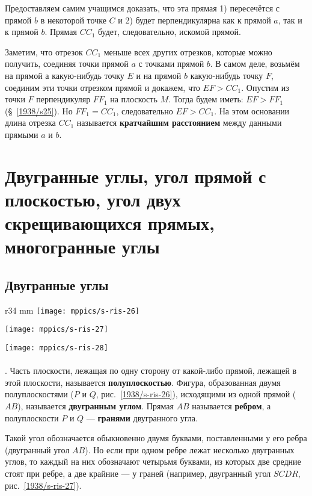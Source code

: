 Предоставляем самим учащимся доказать, что эта прямая 1) пересечётся с прямой $b$ в некоторой точке $C$ и 2) будет перпендикулярна как к прямой $a$, так и к прямой $b$.
Прямая $CC_1$ будет, следовательно, искомой прямой.

Заметим, что отрезок $CC_1$ меньше всех других отрезков, которые можно получить, соединяя точки прямой $a$ с точками прямой $b$.
В самом деле, возьмём на прямой а какую-нибудь точку $E$ и на прямой $b$ какую-нибудь точку $F$, соединим эти точки отрезком прямой и докажем, что $EF>CC_1$.
Опустим из точки $F$ перпендикуляр $FF_1$ на плоскость $M$.
Тогда будем иметь: $EF>FF_1$ (§~\ref{1938/s25}).
Но $FF_1=CC_1$, следовательно $EF>CC_1$.
На этом основании длина отрезка $CC_1$ называется \textbf{кратчайшим расстоянием} между данными прямыми $a$ и $b$.

\section[Углы]{Двугранные углы,
угол прямой с плоскостью,
угол двух скрещивающихся прямых,
многогранные углы}

\subsection*{Двугранные углы}

\begin{wrapfigure}{r}{34 mm}
\centering
\texttt{[image: mppics/s-ris-26]}
\caption{}\label{1938/s-ris-26}
\bigskip
\texttt{[image: mppics/s-ris-27]}
\caption{}\label{1938/s-ris-27}
\bigskip
\texttt{[image: mppics/s-ris-28]}
\caption{}\label{1938/s-ris-28}
\end{wrapfigure}


\paragraph{}\label{1938/s38}
\mbox{.}
Часть плоскости, лежащая по одну сторону от какой-либо прямой, лежащей в этой плоскости, называется \textbf{полуплоскостью}.
Фигура, образованная двумя полуплоскостями ($P$ и $Q$, рис.~\ref{1938/s-ris-26}), исходящими из одной прямой ($AB$), называется \textbf{двугранным углом}.
Прямая $AB$ называется \textbf{ребром}, а полуплоскости $P$ и $Q$ — \textbf{гранями} двугранного угла.

Такой угол обозначается обыкновенно двумя буквами, поставленными у его ребра (двугранный угол $AB$).
Но если при одном ребре лежат несколько двугранных углов, то каждый на них обозначают четырьмя буквами, из которых две средние стоят при ребре, а две крайние — у граней (например, двугранный угол $SCDR$, рис.~\ref{1938/s-ris-27}).

